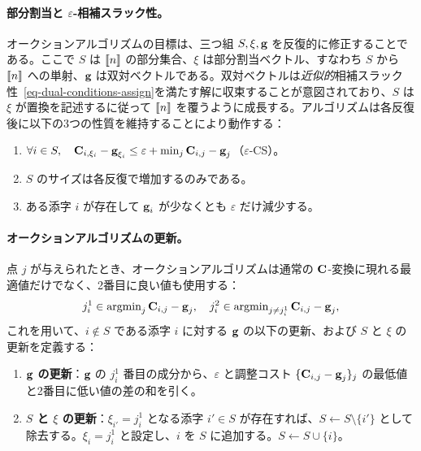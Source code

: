 \paragraph{部分割当と $\varepsilon$-相補スラック性。} オークションアルゴリズムの目標は、三つ組 $S,\xi,\mathrm{\textbf{g}}$ を反復的に修正することである。ここで $S$ は $\llbracket n\rrbracket$ の部分集合、$\xi$ は部分割当ベクトル、すなわち $S$ から $\llbracket n\rrbracket$ への単射、$\mathrm{\textbf{g}}$ は双対ベクトルである。双対ベクトルは\emph{近似的}相補スラック性~\eqref{eq-dual-conditions-assign}を満たす解に収束することが意図されており、$S$ は $\xi$ が置換を記述するに従って $\llbracket n\rrbracket$ を覆うように成長する。アルゴリズムは各反復後に以下の3つの性質を維持することにより動作する：
\begin{enumerate}[label={(\alph*)}]
	\item $\forall i\in S,\quad \mathrm{\textbf{C}}_{i,\xi_i} - \mathrm{\textbf{g}}_{\xi_i}  \leq \varepsilon + \min_{j} \mathrm{\textbf{C}}_{i,j} - \mathrm{\textbf{g}}_{j}$（$\varepsilon$-CS）。
	\item $S$ のサイズは各反復で増加するのみである。
	\item ある添字 $i$ が存在して $\mathrm{\textbf{g}}_i$ が少なくとも $\varepsilon$ だけ減少する。
\end{enumerate}

\paragraph{オークションアルゴリズムの更新。} 点 $j$ が与えられたとき、オークションアルゴリズムは通常の $\mathrm{\textbf{C}}$-変換に現れる最適値だけでなく、2番目に良い値も使用する：
$$j^1_i \in \operatorname{argmin}_{j} \mathrm{\textbf{C}}_{i,j} - \mathrm{\textbf{g}}_{j}, \quad j^2_i \in \operatorname{argmin}_{j\ne j^1_i} \mathrm{\textbf{C}}_{i,j} - \mathrm{\textbf{g}}_{j}, $$
これを用いて、$i\notin S$ である添字 $i$ に対する $\mathrm{\textbf{g}}$ の以下の更新、および $S$ と $\xi$ の更新を定義する：
\begin{enumerate}\item \textbf{$\mathrm{\textbf{g}}$ の更新}：$\mathrm{\textbf{g}}$ の $j^1_i$ 番目の成分から、$\varepsilon$ と調整コスト $\{\mathrm{\textbf{C}}_{i,j}-\mathrm{\textbf{g}}_j\}_j$ の最低値と2番目に低い値の差の和を引く。
\item \textbf{$S$ と $\xi$ の更新}：$\xi_{i'}=j^1_{i}$ となる添字 $i'\in S$ が存在すれば、$S\leftarrow S\setminus \{i'\}$ として除去する。$\xi_{i}=j^1_{i}$ と設定し、$i$ を $S$ に追加する。$S\leftarrow S \cup \{i\}$。
\end{enumerate}


